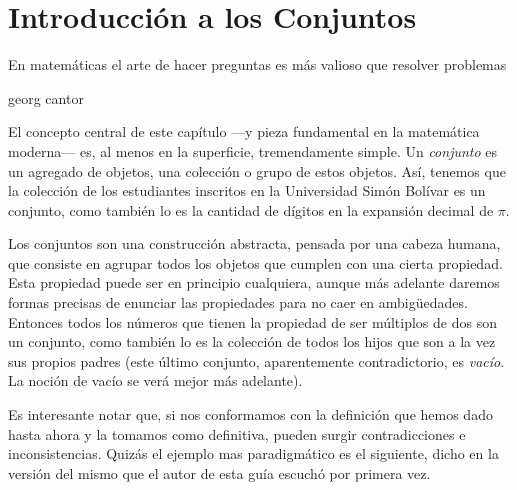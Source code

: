 %
\thispagestyle{plain}

\chapter{Introducción a los Conjuntos}
\epigraph{En matemáticas el arte de hacer preguntas es más valioso que resolver problemas}{georg cantor}

\noindent El concepto central de este capítulo ---y pieza fundamental en la matemática moder\-na--- es, al menos en la superficie, tremendamente simple. Un \textit{conjunto} es un agregado de objetos, una colección o grupo de estos objetos. Así, tenemos que la colección de los estudiantes inscritos en la Universidad Simón Bolívar es un conjunto, como también lo es la cantidad de dígitos en la expansión decimal de $\pi$.
 	
Los conjuntos son una construcción abstracta, pensada por una cabeza humana, que consiste en agrupar todos los objetos que cumplen con una cierta propiedad. Esta propiedad puede ser en principio cualquiera, aunque más adelante daremos formas precisas de enunciar las propiedades para no caer en ambigüedades. Entonces todos los números que tienen la propiedad de ser múltiplos de dos son un conjunto, como también lo es la colección de todos los hijos que son a la vez sus propios padres (este último conjunto, aparentemente contradictorio, es \textit{vacío}. La noción de vacío se verá mejor más adelante).

Es interesante notar que, si nos conformamos con la definición que hemos dado hasta ahora y la tomamos como definitiva, pueden surgir contradicciones e inconsistencias. Quizás el ejemplo mas paradigmático es el siguiente, dicho en la versión del mismo que el autor de esta guía escuchó por primera vez.


